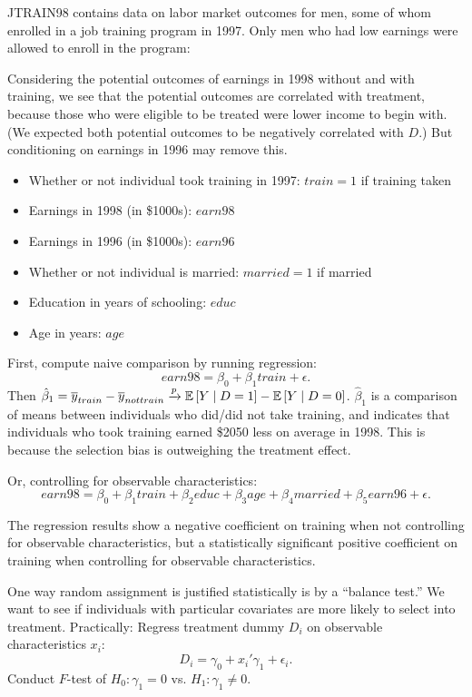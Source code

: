 \begin{example}
	JTRAIN98 contains data on labor market outcomes for men, some of whom enrolled in a job training program in 1997. Only men who had low earnings were allowed to enroll in the program:

	Considering the potential outcomes of earnings in 1998 without and with training, we see that the potential outcomes are correlated with treatment, because those who were eligible to be treated were lower income to begin with. (We expected both potential outcomes to be negatively correlated with $D$.) But conditioning on earnings in 1996 may remove this.

	\begin{itemize}
		\item Whether or not individual took training in 1997: $train = 1$ if training taken
		\item Earnings in 1998 (in \$1000s): $earn98$
		\item Earnings in 1996 (in \$1000s): $earn96$
		\item Whether or not individual is married: $married = 1$ if married
		\item Education in years of schooling: $educ$
		\item Age in years: $age$
	\end{itemize}
	First, compute naive comparison by running regression:
	\[
		earn98 = \beta_0 + \beta_1 train + \epsilon
	.\]Then $\hat{\beta}_1 = \overline{y}_{train} - \overline{y}_{not train} \xrightarrow{p} \mathbb{E}\left[Y \mid D = 1\right] - \mathbb{E}\left[Y \mid D = 0\right] $.
	$\hat{\beta}_1$ is a comparison of means between individuals who did/did not take training, and indicates that individuals who took training earned \$2050 less on average in 1998. This is because the selection bias is outweighing the treatment effect.

	Or, controlling for observable characteristics:
	\[
		earn98 = \beta_0 + \beta_1 train + \beta_2 educ + \beta_3 age + \beta_4 married + \beta_5 earn96 + \epsilon
	.\]

	The regression results show a negative coefficient on training when not controlling for observable characteristics, but a statistically significant positive coefficient on training when controlling for observable characteristics.
\end{example}
\begin{definition}
	One way random assignment is justified statistically is by a ``balance test.'' We want to see if individuals with particular covariates are more likely to select into treatment. Practically: Regress treatment dummy $D_i$ on observable characteristics $x_i$:
	\[
		D_i = \gamma_0 + x_i'\gamma_1 + \epsilon_i
	.\]
	Conduct $F$-test of $H_0:\gamma_1=0$ vs. $H_1:\gamma_1 \ne 0$.
\end{definition}

